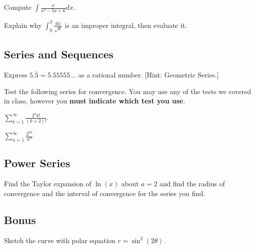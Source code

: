 \documentclass[12pt]{amsart}
\begin{document}
\begin{thm}[10 Points]
  Compute $\displaystyle{\int\frac{x}{x^2 - 5x + 6}}dx$.
\end{thm}

\newpage
\begin{thm}[10 Points]
  Explain why $\displaystyle{\int_0^3 \frac{dx}{\sqrt{x}}}$ is an improper integral, then evaluate it.
\end{thm}

\newpage

\subsection{Series and Sequences}
\begin{thm}[10 Points]
  Express $5.\overline{5} = 5.55555\ldots$ as a rational number. [Hint: Geometric Series.]
\end{thm}

\newpage
Test the following series for convergence.
You may use any of the tests we covered in class, however you {\bf must indicate which test you use}.
\begin{thm}[10 Points]
  $\displaystyle{\sum_{k=1}^\infty \frac{2^k k!}{(k+2)!}}.$
\end{thm}

\newpage

\begin{thm}[10 Points]
  $\displaystyle{\sum_{n=1}^\infty \frac{2^{2n}}{n^n}}$
\end{thm}

\newpage

\subsection{Power Series}

\begin{thm}[10 Points]
  Find the Taylor expansion of $\ln(x)$ about $a = 2$ and find the radius of convergence and the interval of convergence for the series you find.
\end{thm}

\newpage

\subsection{Bonus}

\begin{thm}[10 Points]
  Sketch the curve with polar equation $\displaystyle{r = \sin^2(2\theta)}$.
\end{thm}
\newpage
\end{document}
